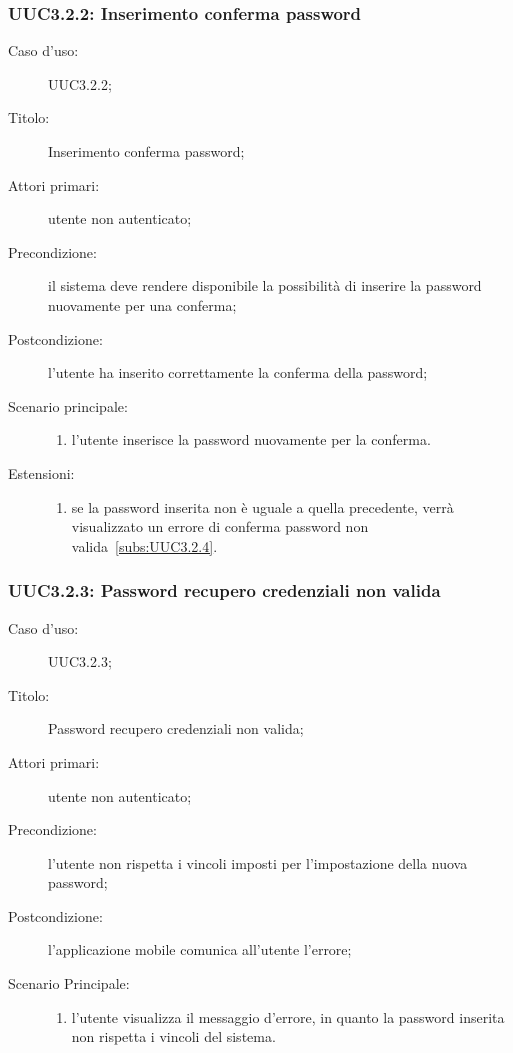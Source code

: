 \documentclass[../../../analisi-dei-requisiti.tex]{subfiles}
\begin{document}
\subsubsection{UUC3.2.2: Inserimento conferma password}%
\label{subs:UUC3.2.2}
\begin{description}
  \item[Caso d’uso:] UUC3.2.2;
  \item[Titolo:] Inserimento conferma password;
  \item[Attori primari:] utente non autenticato;
  \item[Precondizione:] il sistema deve rendere disponibile la possibilità di inserire la password nuovamente per una conferma;
  \item[Postcondizione:] l'utente ha inserito correttamente la conferma della password;
  \item[Scenario principale:]
        \begin{enumerate}
          \item l'utente inserisce la password nuovamente per la conferma.
        \end{enumerate}
  \item[Estensioni:]
        \begin{enumerate}
          \item se la password inserita non è uguale a quella precedente, verrà visualizzato un errore di conferma password non valida~\ref{subs:UUC3.2.4}.
        \end{enumerate}
\end{description}

\subsubsection{UUC3.2.3: Password recupero credenziali non valida}%
\label{subs:UUC3.3}
\begin{description}
  \item[Caso d’uso:] UUC3.2.3;
  \item[Titolo:] Password recupero credenziali non valida;
  \item[Attori primari:] utente non autenticato;
  \item[Precondizione:] l'utente non rispetta i vincoli imposti per l'impostazione della nuova password;
  \item[Postcondizione:] l'applicazione mobile comunica all'utente l'errore;
  \item[Scenario Principale:]
        \begin{enumerate}
          \item l'utente visualizza il messaggio d'errore, in quanto la password inserita non rispetta i vincoli del sistema.
        \end{enumerate}
\end{description}
\end{document}
